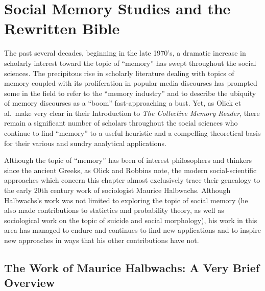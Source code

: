 \hypertarget{social-memory-studies-and-the-rwb}{%
\chapter{Social Memory Studies and the
Rewritten Bible}\label{social-memory-studies-and-the-rwb}}

The past several decades, beginning in the late 1970's, a dramatic
increase in scholarly interest toward the topic of ``memory'' has swept
throughout the social sciences. The precipitous rise in scholarly
literature dealing with topics of memory coupled with its proliferation
in popular media discourses has prompted some in the field to refer to
the ``memory industry'' and to describe the ubiquity of memory
discourses as a ``boom'' fast-approaching a
bust.\autocites{rosenfeld_jmh2009}{winter2006}{berliner_aq2005} Yet, as
Olick et al.~make very clear in their Introduction to \emph{The
Collective Memory Reader}, there remain a significant number of scholars
throughout the social sciences who continue to find ``memory'' to a
useful heuristic and a compelling theoretical basis for their various
and sundry analytical applications.\autocite[3--6]{olick_olick-etal2011}

Although the topic of ``memory'' has been of interest philosophers and
thinkers since the ancient Greeks, as Olick and Robbins note, the modern
social-scientific approaches which concern this chapter almost
exclusively trace their genealogy to the early 20th century work of
sociologist Maurice Halbwachs.\autocites[106]{olick-robbins_ars1998}[It
should be noted, however, that Halbwachs was not the first or only
person to do work on memory or the impact of society thereon, despite
most recent literature's preoccupation with him,
see][8--36]{olick_olick-etal2011} Although Halbwachs's work was not
limited to exploring the topic of social memory (he also made
contributions to statictics and probability theory, as well as
sociological work on the topic of suicide and social
morphology\autocite[13--20]{coser_halbwachs1992}), his work in this area
has managed to endure and continues to find new applications and to
inspire new approaches in ways that his other contributions have not.

\hypertarget{the-work-of-maurice-halbwachs-a-very-brief-overview}{%
\section{The Work of Maurice Halbwachs: A Very Brief
Overview}\label{the-work-of-maurice-halbwachs-a-very-brief-overview}}

